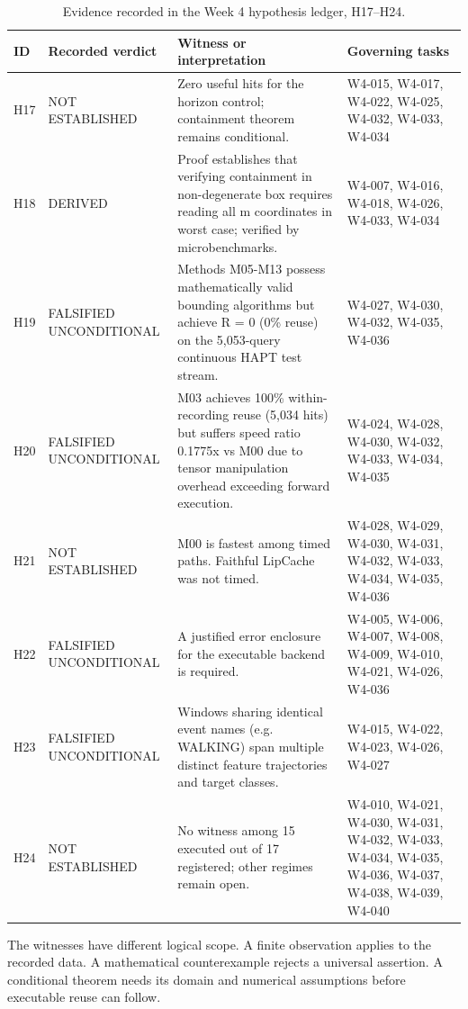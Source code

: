 \begin{table}[H]
\caption{Evidence recorded in the Week 4 hypothesis ledger, H17--H24.}
\centering\small
\begin{tabularx}{\textwidth}{@{}lYYY@{}}\toprule
ID & Recorded verdict & Witness or interpretation & Governing tasks\\
\midrule
H17 & NOT ESTABLISHED & Zero useful hits for the horizon control; containment theorem remains conditional. & W4-015, W4-017, W4-022, W4-025, W4-032, W4-033, W4-034\\
H18 & DERIVED & Proof establishes that verifying containment in non-degenerate box requires reading all m coordinates in worst case; verified by microbenchmarks. & W4-007, W4-016, W4-018, W4-026, W4-033, W4-034\\
H19 & FALSIFIED UNCONDITIONAL & Methods M05-M13 possess mathematically valid bounding algorithms but achieve R = 0 (0\% reuse) on the 5,053-query continuous HAPT test stream. & W4-027, W4-030, W4-032, W4-035, W4-036\\
H20 & FALSIFIED UNCONDITIONAL & M03 achieves 100\% within-recording reuse (5,034 hits) but suffers speed ratio 0.1775x vs M00 due to tensor manipulation overhead exceeding forward execution. & W4-024, W4-028, W4-030, W4-032, W4-033, W4-034, W4-035\\
H21 & NOT ESTABLISHED & M00 is fastest among timed paths. Faithful LipCache was not timed. & W4-028, W4-029, W4-030, W4-031, W4-032, W4-033, W4-034, W4-035, W4-036\\
H22 & FALSIFIED UNCONDITIONAL & A justified error enclosure for the executable backend is required. & W4-005, W4-006, W4-007, W4-008, W4-009, W4-010, W4-021, W4-026, W4-036\\
H23 & FALSIFIED UNCONDITIONAL & Windows sharing identical event names (e.g. WALKING) span multiple distinct feature trajectories and target classes. & W4-015, W4-022, W4-023, W4-026, W4-027\\
H24 & NOT ESTABLISHED & No witness among 15 executed out of 17 registered; other regimes remain open. & W4-010, W4-021, W4-030, W4-031, W4-032, W4-033, W4-034, W4-035, W4-036, W4-037, W4-038, W4-039, W4-040\\
\bottomrule\end{tabularx}
\end{table}
The witnesses have different logical scope. A finite observation applies to the recorded data. A mathematical counterexample rejects a universal assertion. A conditional theorem needs its domain and numerical assumptions before executable reuse can follow.
